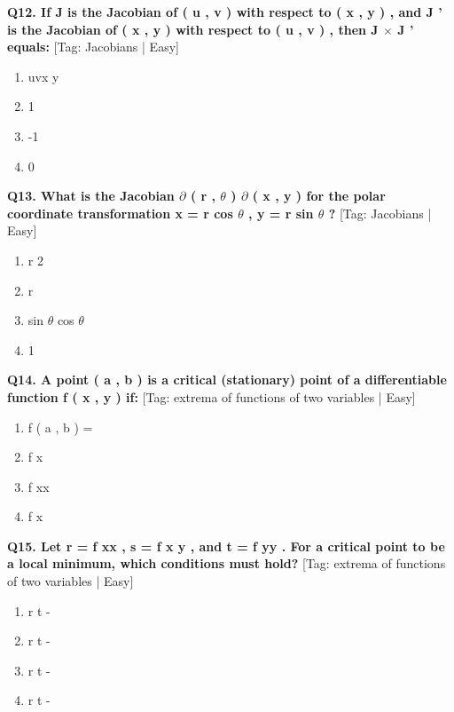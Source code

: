 \noindent\textbf{Q12. If J is the Jacobian of ( u , v ) with respect to ( x , y ) , and J ' is the Jacobian of ( x , y ) with respect to ( u , v ) , then J $\times$ J ' equals:} \hfill [Tag: Jacobians | Easy]
\begin{enumerate}[label=(\alph*),topsep=2pt,itemsep=1pt,partopsep=0pt,parsep=0pt]
    \item {{uvx y}}
    \item {{1}}
    \item {{-1}}
    \item {{0}}
\end{enumerate}
\vspace{2mm}

\noindent\textbf{Q13. What is the Jacobian $\partial$ ( r , $\theta$ ) $\partial$ ( x , y ) for the polar coordinate transformation x = r cos $\theta$ , y = r sin $\theta$ ?} \hfill [Tag: Jacobians | Easy]
\begin{enumerate}[label=(\alph*),topsep=2pt,itemsep=1pt,partopsep=0pt,parsep=0pt]
    \item {{r 2}}
    \item {{r}}
    \item {{sin $\theta$ cos $\theta$}}
    \item {{1}}
\end{enumerate}
\vspace{2mm}

\noindent\textbf{Q14. A point ( a , b ) is a critical (stationary) point of a differentiable function f ( x , y ) if:} \hfill [Tag: extrema of functions of two variables | Easy]
\begin{enumerate}[label=(\alph*),topsep=2pt,itemsep=1pt,partopsep=0pt,parsep=0pt]
    \item {{f ( a , b ) =}}
    \item {{f x}}
    \item {{f xx}}
    \item {{f x}}
\end{enumerate}
\vspace{2mm}

\noindent\textbf{Q15. Let r = f xx , s = f x y , and t = f yy . For a critical point to be a local minimum, which conditions must hold?} \hfill [Tag: extrema of functions of two variables | Easy]
\begin{enumerate}[label=(\alph*),topsep=2pt,itemsep=1pt,partopsep=0pt,parsep=0pt]
    \item {{r t -}}
    \item {{r t -}}
    \item {{r t -}}
    \item {{r t -}}
\end{enumerate}
\vspace{2mm}

